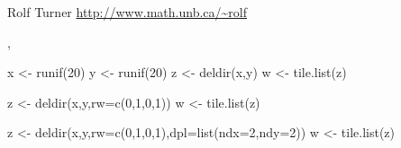 \begin{Author}\relax
Rolf Turner
\url{http://www.math.unb.ca/~rolf}
\end{Author}
\begin{SeeAlso}\relax
{}, 
\end{SeeAlso}
\begin{Examples}
\begin{ExampleCode}
        x <- runif(20)
        y <- runif(20)
        z <- deldir(x,y)
        w <- tile.list(z)

        z <- deldir(x,y,rw=c(0,1,0,1))
        w <- tile.list(z)

        z <- deldir(x,y,rw=c(0,1,0,1),dpl=list(ndx=2,ndy=2))
        w <- tile.list(z)

\end{ExampleCode}
\end{Examples}

